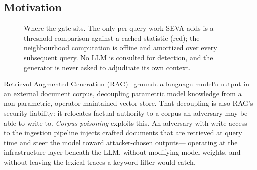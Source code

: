 \documentclass[10pt,journal,compsoc]{IEEEtran}
\begin{document}
\subsection{Motivation}
\begin{figure}[t]
\centering
{}
\caption{Where the gate sits. The only per-query work SEVA adds is a threshold comparison against
a cached statistic (red); the neighbourhood computation is offline and amortized over every
subsequent query. No LLM is consulted for detection, and the generator is never asked to
adjudicate its own context.}
\label{fig:pipeline}
\end{figure}
Retrieval-Augmented Generation (RAG)~\cite{lewis2020} grounds a language model's
output in an external document corpus, decoupling parametric model knowledge from a
non-parametric, operator-maintained vector store. That decoupling is also RAG's
security liability: it relocates factual authority to a corpus an adversary may
be able to write to. \emph{Corpus poisoning} exploits this. An adversary with
write access to the ingestion pipeline injects crafted documents that are
retrieved at query time and steer the model toward attacker-chosen outputs---%
operating at the infrastructure layer beneath the LLM, without modifying model
weights, and without leaving the lexical traces a keyword filter would catch.
\end{document}
